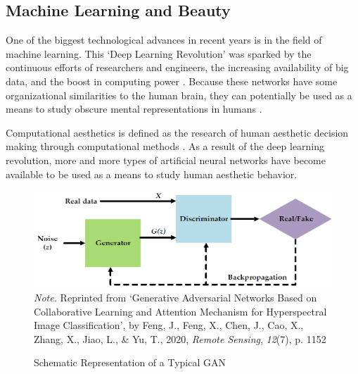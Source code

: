 \documentclass[../main.tex]{subfiles}
\begin{document}
\subsection{Machine Learning and Beauty}
One of the biggest technological advances in recent years is in the field of machine learning. This `Deep Learning Revolution' was sparked by the continuous efforts of researchers and engineers, the increasing availability of big data, and the boost in computing power \parencite{sejnowskiDeepLearningRevolution2018}. Because these networks have some organizational similarities to the human brain, they can potentially be used as a means to study obscure mental representations in humans \parencite{guoDeepLearningVisual2016, goetschalckx2021generative}. 

Computational aesthetics is defined as the research of human aesthetic decision making through computational methods \parencite{valenziseAdvancesChallengesComputational2022, hoenig2005defining}. As a result of the deep learning revolution, more and more types of artificial neural networks have become available to be used as a means to study human aesthetic behavior.

\begin{figure}[!h]
	\caption{Schematic Representation of a Typical GAN}
	\label{fig:gan-simple}
	\includegraphics[width=1\linewidth]{images/gan_simple}
	{\textit{Note.} Reprinted from `Generative Adversarial Networks Based on Collaborative Learning and Attention Mechanism for Hyperspectral Image Classification', by Feng, J., Feng, X., Chen, J., Cao, X., Zhang, X., Jiao, L., \& Yu, T., 2020, \textit{Remote Sensing}, \textit{12}(7), p. 1152}
\end{figure}
\end{document}
